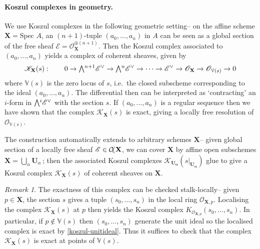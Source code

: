 \documentclass[a4paper]{article}
\theoremstyle{definition}
\theoremstyle{remark}
\newtheorem{remark}[defn]{Remark}
\newcommand{\Exter}{\mathchoice{{\textstyle\bigwedge}}%
    {{\bigwedge}}%
    {{\textstyle\wedge}}%
    {{\scriptstyle\wedge}}}
\DeclareMathOperator{\coh}{\mathcal{C\kern -2pt o\kern -2pt h\kern -1pt}}
\begin{document}
\paragraph{Koszul complexes in geometry.} We use Koszul complexes in the
following geometric setting-- on the affine scheme \(\mathbf{X}=\text{Spec }A\),
an \((n+1)\)-tuple \((a_0,...,a_n)\) in \(A\) can be seen as a global section of
the free sheaf \(\mathscr{E}=\mathscr{O}_\mathbf{X}^ {\oplus (n+1)}\). Then the
Koszul complex associated to \((a_0,...,a_n)\) yields a complex of coherent
sheaves, given by
\begin{gather*}
    \mathscr{K}_\mathbf{X}(s): \qquad 0\rightarrow \Exter^{n+1}\mathscr{E}^\vee
    \rightarrow \Exter^{n}\mathscr{E}^\vee \rightarrow\cdots \rightarrow
    \mathscr{E}^\vee \rightarrow \mathscr{O}_\mathbf{X}\rightarrow
    \mathscr{O}_{\mathbb{V}(s)}\rightarrow 0
\end{gather*}
where \(\mathbb{V}(s)\) is the zero locus of \(s\), i.e.\ the
closed subscheme corresponding to the ideal \((a_0,...,a_n)\). The differential
then can be interpreted as `contracting' an \(i\)-form in \(\Exter^i
\mathscr{E}^\vee\) with the section \(s\). If \((a_0,...,a_n)\) is a regular
sequence then we have shown that the complex \(\mathscr{K}_\mathbf{X}(s)\) is
exact, giving a locally free resolution of \(\mathscr{O}_{\mathbb{V}(s)}\).

The construction automatically extends to arbitrary schemes \(\mathbf{X}\)--
given global section of a locally free sheaf \(\mathscr{E}\in \coh\mathbf{X}\),
we can cover \(\mathbf{X}\) by affine open subschemes
\(\mathbf{X}=\bigcup_\alpha \mathbf{U}_\alpha\,\); then the associated Koszul
complexes \(\mathscr{K}_\mathbf{U_\alpha}(s|_\mathbf{U_\alpha})\) glue to give a
Koszul complex \(\mathscr{K}_\mathbf{X}(s)\) of coherent sheaves on
\(\mathbf{X}\). 

\begin{remark}\label{koszul-exactness-remark}
    The exactness of this complex can be checked stalk-locally-- given
    \(p\in \mathbf{X}\), the section \(s\) gives a tuple \((s_0,...,s_n)\) in
    the local ring \(\mathscr{O}_{\mathbf{X},p}\). Localising the complex
    \(\mathscr{K}_{\mathbf{X}}(s)\) at \(p\) then yields the Koszul complex
    \(K_{\mathscr{O}_{\mathbf{X},p}}(s_0,...,s_n)\). In particular, if \(p\notin
    \mathbb{V}(s)\) then \((s_0,...,s_n)\) generate the unit ideal so the
    localised complex is exact by \cref{koszul-unitideal}. Thus it suffices to
    check that the complex \(\mathscr{K}_{\mathbf{X}}(s)\) is exact at points of
    \(\mathbb{V}(s)\).
\end{remark}
\end{document}
